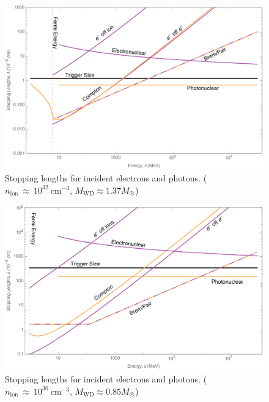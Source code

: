 \documentclass[twocolumn, preprintnumbers,amsmath,amssymb,prd, superscriptaddress]{revtex4}
\begin{document}
\begin{figure}
\includegraphics[scale=.3]{SPhighEM.pdf}
\caption{Stopping lengths for incident electrons and photons. ($n_\text{ion}~\approx~10^{32}~\text{cm}^{-3}$, $M_\text{WD} \approx 1.37 M_{\astrosun}$)}
\label{fig:SPhighEM}
\end{figure}

\begin{figure}
\includegraphics[scale=.3]{SPlowEM.pdf}
\caption{Stopping lengths for incident electrons and photons. ($n_\text{ion}~\approx~10^{30}~\text{cm}^{-3}$, $M_\text{WD} \approx 0.85 M_{\astrosun}$)}
\label{fig:SPlowEM}
\end{figure}
\end{document}
